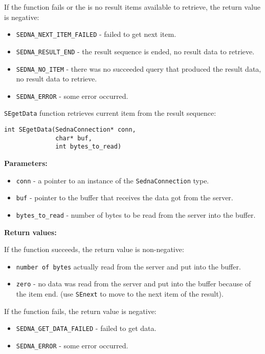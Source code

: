 \documentclass[a4paper,12pt]{article}
\newenvironment{citemize}
{\begin{itemize}
  \setlength{\itemsep}{0pt}
  \setlength{\parskip}{0pt}
  \setlength{\parsep}{0pt}}
{\end{itemize}}
\begin{document}
\noindent
If the function fails or the is no result items available to retrieve, the
return value is negative:

\begin{citemize}
\item\verb!SEDNA_NEXT_ITEM_FAILED! - failed to get next item.
\item\verb!SEDNA_RESULT_END! - the result sequence is ended, no result data to
retrieve.
\item\verb!SEDNA_NO_ITEM! - there was no succeeded query that produced the
result data, no result data to retrieve.
\item\verb!SEDNA_ERROR! - some error occurred.
\end{citemize}

\verb!SEgetData! function retrieves current item from the result sequence:

\begin{verbatim}
int SEgetData(SednaConnection* conn,
              char* buf,
              int bytes_to_read)
\end{verbatim}

\noindent
\textbf{Parameters:}

\begin{citemize}
\item\verb!conn! - a pointer to an instance of the \verb!SednaConnection! type.
\item\verb!buf! - pointer to the buffer that receives the data got from the
server.
\item\verb!bytes_to_read! - number of bytes to be read from the server into the
buffer.
\end{citemize}

\noindent
\textbf{Return values:}

\medskip

\noindent
If the function succeeds, the return value is non-negative:

\begin{citemize}
\item\verb!number of bytes! actually read from the server and put into the
buffer.
\item\verb!zero! - no data was read from the server and put into the buffer
because of the item end. (use \verb!SEnext! to move to the next item of the
result).
\end{citemize}

\noindent
If the function fails, the return value is negative:

\begin{citemize}
\item\verb!SEDNA_GET_DATA_FAILED! - failed to get data.
\item\verb!SEDNA_ERROR! - some error occurred.
\end{citemize}
\end{document}
